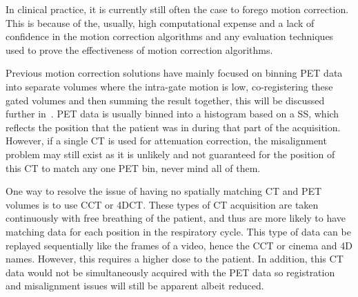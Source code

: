         In clinical practice, it is currently still often the case to forego motion correction. This is because of the, usually, high computational expense and a lack of confidence in the motion correction algorithms and any evaluation techniques used to prove the effectiveness of motion correction algorithms.%
    
        Previous motion correction solutions have mainly focused on binning \gls{PET} data into separate volumes where the intra-gate motion is low, co-registering these gated volumes and then summing the result together, this will be discussed further in~. \gls{PET} data is usually binned into a histogram based on a \gls{SS}, which reflects the position that the patient was in during that part of the acquisition. However, if a single \gls{CT} is used for attenuation correction, the misalignment problem may still exist as it is unlikely and not guaranteed for the position of this \gls{CT} to match any one \gls{PET} bin, never mind all of them.
        
        One way to resolve the issue of having no spatially matching \gls{CT} and \gls{PET} volumes is to use \gls{CCT} or \gls{4DCT}. These types of \gls{CT} acquisition are taken continuously with free breathing of the patient, and thus are more likely to have matching data for each position in the respiratory cycle.  This type of data can be replayed sequentially like the frames of a video, hence the \gls{CCT} or cinema and \gls{4D} names. However, this requires a higher dose to the patient. In addition, this \gls{CT} data would not be simultaneously acquired with the \gls{PET} data so registration and misalignment issues will still be apparent albeit reduced. 
        
